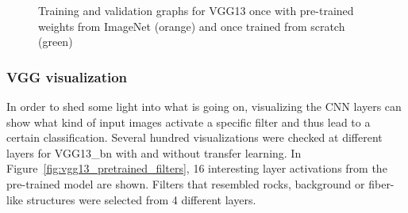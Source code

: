 \begin{figure}[!h]
\centering
\caption{Training and validation graphs for VGG13 once with pre-trained weights from ImageNet (orange) and once trained from scratch (green)}
\label{fig:vgg13-graph}
\end{figure}

\newpage

\subsubsection{VGG visualization}

In order to shed some light into what is going on, visualizing the CNN layers can show what kind of input images activate a specific filter and thus lead to a certain classification. Several hundred visualizations were checked at different layers for VGG13\_bn with and without transfer learning. In Figure~\ref{fig:vgg13_pretrained_filters}, 16 interesting layer activations from the pre-trained model are shown. Filters that resembled rocks, background or fiber-like structures were selected from 4 different layers. \\


